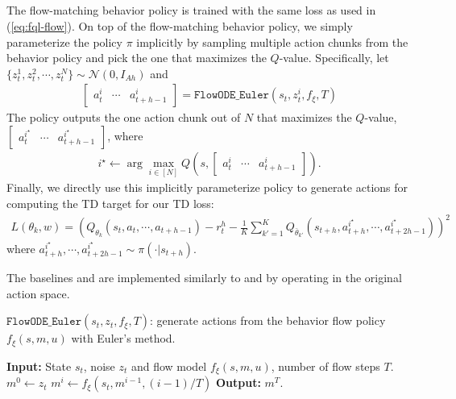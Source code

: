 \subsection{}
The flow-matching behavior policy is trained with the same loss as used in  (\cref{eq:fql-flow}). On top of the flow-matching behavior policy, we simply parameterize the policy $\pi$ implicitly by sampling multiple action chunks from the behavior policy and pick the one that maximizes the $Q$-value. Specifically, let $\{z_t^1, z^2_t, \cdots, z^N_t\} \sim \mathcal{N}(0, I_{Ah})$ and
\begin{align*}
    \begin{bmatrix}a_t^i & \cdots & a_{t+h-1}^{i}  \end{bmatrix} = \mathtt{FlowODE\_Euler}(s_t, z^i_t, f_\xi, T)
\end{align*}
The policy outputs the one action chunk out of $N$ that maximizes the $Q$-value, $\begin{bmatrix}a_t^{i^\star} & \cdots & a_{t+h-1}^{i^\star}  \end{bmatrix}$, where
\begin{align*}
     i^\star \leftarrow \arg\max_{i \in [N]} Q(s, \begin{bmatrix}a_t^i & \cdots & a_{t+h-1}^{i}  \end{bmatrix}).
\end{align*}
Finally, we directly use this implicitly parameterize policy to generate actions for computing the TD target for our TD loss:
\begin{align}
    L(\theta_k, w) = \left(Q_{\theta_k}(s_t, a_t, \cdots, a_{t+h-1}) - r^h_t - \frac{1}{K}\sum_{k'=1}^{K} Q_{\bar \theta_{k'}}(s_{t+h}, a^{i^\star}_{t+h}, \cdots, a^{i^\star}_{t+2h-1})\right)^2
    \label{eq:bfn-critic}
\end{align}
where $a^{i^\star}_{t+h}, \cdots, a^{i^\star}_{t+2h-1} \sim \pi(\cdot | s_{t+h})$.

The baselines  and  are implemented similarly to  and  by operating in the original action space.


\begin{algorithm}[t]
  \caption{$\mathtt{FlowODE\_Euler}(s_t, z_t, f_\xi, T)$: generate actions from the behavior flow policy $f_\xi(s, m, u)$ with Euler's method.}\label{algo:flow-step}
  \begin{algorithmic}
\State \textbf{Input:} State $s_t$, noise $z_t$ and flow model $f_\xi(s, m, u)$, number of flow steps $T$.
\State $m^0 \leftarrow z_t$
    \State $m^i \leftarrow f_\xi(s_t, m^{i-1}, (i-1)/T)$
\EndFor
\State \textbf{Output:} $m^T$.
\end{algorithmic}
\end{algorithm}



